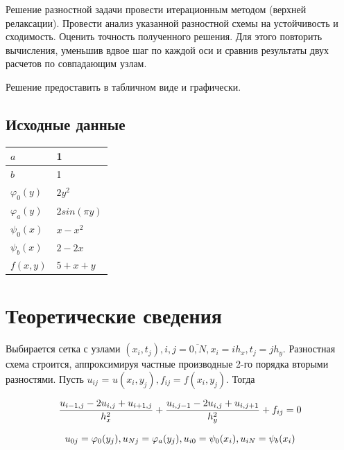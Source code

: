 \documentclass[a4paper,12pt]{article}
\begin{document}
Решение разностной задачи провести итерационным методом (верхней релаксации). Провести анализ указанной разностной схемы на устойчивость и сходимость. Оценить точность полученного решения. Для этого повторить вычисления, уменьшив вдвое шаг по каждой оси и сравнив результаты двух расчетов по совпадающим узлам.

Решение предоставить в табличном виде и графически.

\subsection{Исходные данные}


    \begin{tabular}{|C|M|}
        \hline
	 $a$ & 1 \\ \hline
	 $b$ & 1 \\ \hline
         $\varphi_0(y)$ & $2y^2$ \\ \hline
         $\varphi_a(y)$ & $2{sin(\pi y)}$ \\ \hline
         $\psi_0(x)$ & $x - x^2$ \\ \hline
         $\psi_b(x)$ & $2 - 2x$ \\ \hline
	 $f(x, y)$ & $5 + x + y$ \\ \hline
    \end{tabular}


\newpage
\section{Теоретические сведения}

Выбирается сетка с узлами $(x_i,t_j), i, j=\overline{0,N}, x_i=ih_x, t_j=jh_y $. Разностная схема строится, аппроксимируя частные производные 2-го порядка вторыми разностями. Пусть $u_{ij}$ = $u(x_i, y_j), f_{ij} = f(x_i, y_j)$. Тогда 

\begin{equation}
 \frac{u_{i-1,j} - 2u_{i,j} + u_{i+1,j}}{h_x^2} + \frac{u_{i,j-1} - 2u_{i,j} + u_{i,j+1}}{h_y^2} + f_{ij} = 0\\
\end{equation}

\begin{equation}
u_{0j} = \varphi_0(y_j), u_{Nj} = \varphi_a(y_j), u_{i0} = \psi_0(x_i), u_{iN} = \psi_b(x_i)\\
\end{equation}
\end{document}
